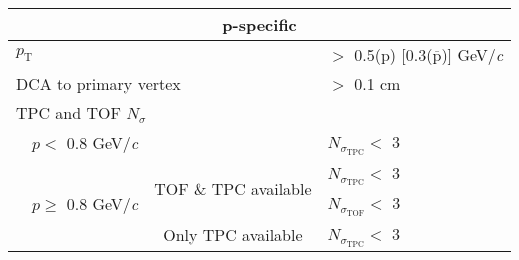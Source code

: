 \documentclass[ALICE,manyauthors]{cernphprep}
\newcommand{\Lam}{$\Lambda$\xspace}
\begin{document}
\begin{table}[htbp]
\begin{tabular}{lc|c|l}
   
   \multicolumn{4}{c}{\textbf{p-specific {\color{red}{cuts}}}} \\
   \hline
   \multicolumn{3}{l|}{$p_{\mathrm{T}}$} & $ > $ 0.5(p) [0.3($\overline{\mathrm{p}}$)] GeV/\textit{c} \\
   \hline
   \multicolumn{3}{l|}{DCA to primary vertex} & $>$ 0.1 cm \\
   \hline
   \multicolumn{4}{l}{TPC and TOF $N_{\sigma}$ {\color{red}{Cuts}}} \\
   \cline{2-4}
    & \multicolumn{1}{c}{$p <$ 0.8 GeV/\textit{c}} & & $N_{\sigma_{\mathrm{TPC}}} <$ 3 \\
   \cline{2-4}
    & \multicolumn{1}{c}{\multirow{3}{*}{$p \geq$ 0.8 GeV/\textit{c}}} &  \multirow{2}{*}{TOF \& TPC available} & $N_{\sigma_{\mathrm{TPC}}} <$ 3 \\
    & \multicolumn{2}{c|}{} & $N_{\sigma_{\mathrm{TOF}}} <$ 3 \\
   \cline{3-4}
    & \multicolumn{1}{c}{} & Only TPC available & $N_{\sigma_{\mathrm{TPC}}} <$ 3 \\
   \hline   
  \end{tabular}
 \caption{{\color{red}{\Lam selection}}}
 \label{tab:LamCuts} 
\end{table}
\end{document}
